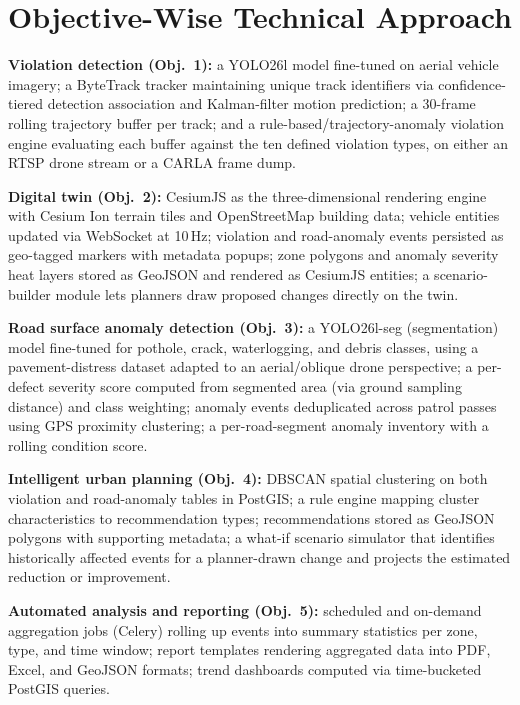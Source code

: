 \documentclass[conference]{IEEEtran}
\begin{document}
\section{Objective-Wise Technical Approach}
\label{sec:approach}

\textbf{Violation detection (Obj.~1):} a YOLO26l model fine-tuned on aerial vehicle imagery; a ByteTrack tracker maintaining unique track identifiers via confidence-tiered detection association and Kalman-filter motion prediction; a 30-frame rolling trajectory buffer per track; and a rule-based/trajectory-anomaly violation engine evaluating each buffer against the ten defined violation types, on either an RTSP drone stream or a CARLA frame dump.

\textbf{Digital twin (Obj.~2):} CesiumJS as the three-dimensional rendering engine with Cesium Ion terrain tiles and OpenStreetMap building data; vehicle entities updated via WebSocket at 10\,Hz; violation and road-anomaly events persisted as geo-tagged markers with metadata popups; zone polygons and anomaly severity heat layers stored as GeoJSON and rendered as CesiumJS entities; a scenario-builder module lets planners draw proposed changes directly on the twin.

\textbf{Road surface anomaly detection (Obj.~3):} a YOLO26l-seg (segmentation) model fine-tuned for pothole, crack, waterlogging, and debris classes, using a pavement-distress dataset adapted to an aerial/oblique drone perspective; a per-defect severity score computed from segmented area (via ground sampling distance) and class weighting; anomaly events deduplicated across patrol passes using GPS proximity clustering; a per-road-segment anomaly inventory with a rolling condition score.

\textbf{Intelligent urban planning (Obj.~4):} DBSCAN spatial clustering on both violation and road-anomaly tables in PostGIS; a rule engine mapping cluster characteristics to recommendation types; recommendations stored as GeoJSON polygons with supporting metadata; a what-if scenario simulator that identifies historically affected events for a planner-drawn change and projects the estimated reduction or improvement.

\textbf{Automated analysis and reporting (Obj.~5):} scheduled and on-demand aggregation jobs (Celery) rolling up events into summary statistics per zone, type, and time window; report templates rendering aggregated data into PDF, Excel, and GeoJSON formats; trend dashboards computed via time-bucketed PostGIS queries.
\end{document}

